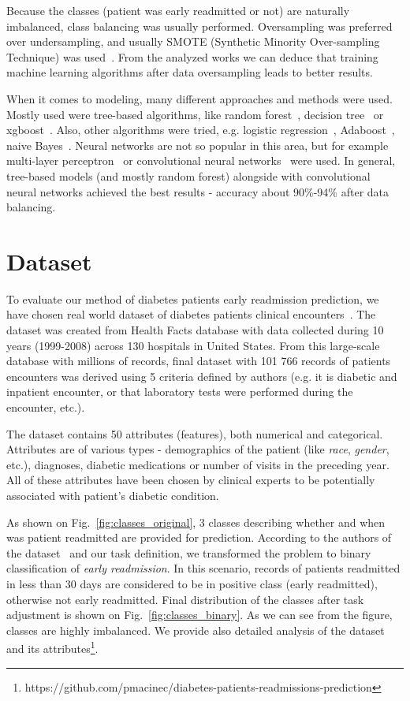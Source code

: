 \documentclass[runningheads]{llncs}
\begin{document}
Because the classes (patient was early readmitted or not) are naturally imbalanced, class balancing was usually performed. Oversampling was preferred over undersampling, and usually SMOTE (Synthetic Minority Over-sampling Technique) was used~\cite{Sharma2019,Hammoudeh2018}. From the analyzed works we can deduce that training machine learning algorithms after data oversampling leads to better results.

When it comes to modeling, many different approaches and methods were used. Mostly used were tree-based algorithms, like random forest~\cite{Sharma2019,Bhuvan2016}, decision tree~\cite{Sharma2019} or xgboost~\cite{Sharma2019}. Also, other algorithms were tried, e.g. logistic regression~\cite{Sharma2019}, Adaboost~\cite{Sharma2019,Bhuvan2016}, naive Bayes~\cite{Bhuvan2016}. Neural networks are not so popular in this area, but for example multi-layer perceptron~\cite{Bhuvan2016} or convolutional neural networks~\cite{Hammoudeh2018} were used. In general, tree-based models (and mostly random forest) alongside with convolutional neural networks achieved the best results - accuracy about 90\%-94\% after data balancing.


\section{Dataset}

To evaluate our method of diabetes patients early readmission prediction, we have chosen real world dataset of diabetes patients clinical encounters~\cite{Strack2014}. The dataset was created from Health Facts database with data collected during 10 years (1999-2008) across 130 hospitals in United States. From this large-scale database with millions of records, final dataset with 101 766 records of patients encounters was derived using 5 criteria defined by authors (e.g. it is diabetic and inpatient encounter, or that laboratory tests were performed during the encounter, etc.).

The dataset contains 50 attributes (features), both numerical and categorical. Attributes are of various types - demographics of the patient (like \textit{race}, \textit{gender}, etc.), diagnoses, diabetic medications or number of visits in the preceding year. All of these attributes have been chosen by clinical experts to be potentially associated with patient's diabetic condition.

As shown on Fig.~\ref{fig:classes_original}, 3 classes describing whether and when was patient readmitted are provided for prediction. According to the authors of the dataset~\cite{Strack2014} and our task definition, we transformed the problem to binary classification of \textit{early readmission}. In this scenario, records of patients readmitted in less than 30 days are considered to be in positive class (early readmitted), otherwise not early readmitted. Final distribution of the classes after task adjustment is shown on Fig.~\ref{fig:classes_binary}. As we can see from the figure, classes are highly imbalanced. We provide also detailed analysis of the dataset and its attributes\footnote{https://github.com/pmacinec/diabetes-patients-readmissions-prediction}.
\end{document}

